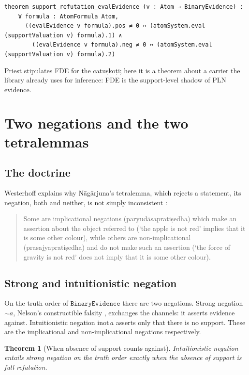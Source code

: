 \documentclass[11pt]{article}
\newcommand{\code}[1]{\texttt{#1}}
\newcommand{\BE}{\code{BinaryEvidence}}
\theoremstyle{plain}
\newtheorem{theorem}{Theorem}[section]
\theoremstyle{definition}
\begin{document}
\begin{lstlisting}
theorem support_refutation_evalEvidence (v : Atom → BinaryEvidence) :
    ∀ formula : AtomFormula Atom,
      ((evalEvidence v formula).pos ≠ 0 ↔ (atomSystem.eval (supportValuation v) formula).1) ∧
        ((evalEvidence v formula).neg ≠ 0 ↔ (atomSystem.eval (supportValuation v) formula).2)
\end{lstlisting}

\noindent Priest stipulates FDE for the catuṣkoṭi; here it is a theorem about a carrier the
library already uses for inference: FDE is the support-level shadow of PLN evidence.

\section{Two negations and the two tetralemmas}
\label{sec:negations}

\subsection{The doctrine}

Westerhoff explains why Nāgārjuna's tetralemma, which rejects a statement, its negation, both
and neither, is not simply inconsistent \cite[p.~28]{Westerhoff2007}:

\begin{quote}
Some are implicational negations (paryudāsapratiṣedha) which make an assertion about the
object referred to (`the apple is not red' implies that it is some other colour), while
others are non-implicational (prasajyapratiṣedha) and do not make such an assertion (`the
force of gravity is not red' does not imply that it is some other colour).
\end{quote}

\subsection{Strong and intuitionistic negation}

On the truth order of $\BE$ there are two negations. Strong negation $\sim a$, Nelson's
constructible falsity \cite{Nelson1949}, exchanges the channels: it asserts evidence against. Intuitionistic negation
$\mathrm{inot}\,a$ asserts only that there is no support. These are the implicational and
non-implicational negations respectively.

\begin{theorem}[When absence of support counts against]
Intuitionistic negation entails strong negation on the truth order exactly when the absence
of support is full refutation.
\end{theorem}
\end{document}
